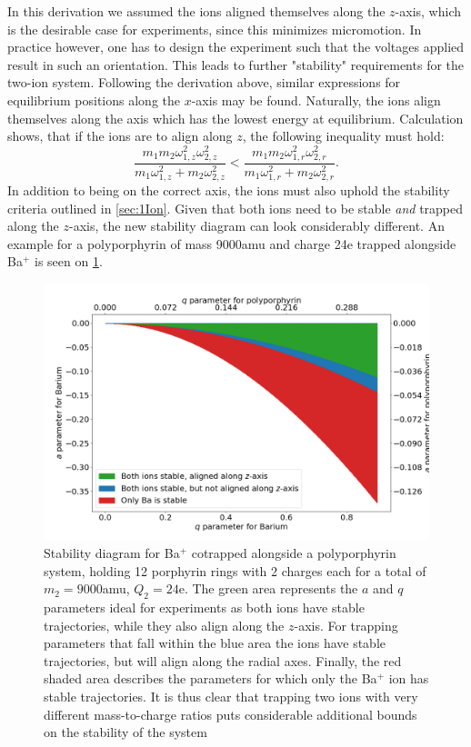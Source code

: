 In this derivation we assumed the ions aligned themselves along the $z$-axis, which is the desirable case for experiments, since this minimizes micromotion. In practice however, one has to design the experiment such that the voltages applied result in such an orientation. This leads to further "stability" requirements for the two-ion system.
Following the derivation above, similar expressions for equilibrium positions along the $x$-axis may be found. Naturally, the ions align themselves along the axis which has the lowest energy at equilibrium. Calculation shows, that if the ions are to align along $z$, the following inequality must hold:
\begin{equation}
    \frac{m_1m_2\omega_{1,z}^2\omega_{2,z}^2}{m_1\omega_{1,z}^2+m_2\omega_{2,z}^2} < \frac{m_1m_2\omega_{1,r}^2\omega_{2,r}^2}{m_1\omega_{1,r}^2+m_2\omega_{2,r}^2}.
\end{equation}
In addition to being on the correct axis, the ions must also uphold the stability criteria outlined in \cref{sec:1Ion}. Given that both ions need to be stable \textit{and} trapped along the $z$-axis, the new stability diagram can look considerably different. An example for a polyporphyrin of mass 9000amu and charge 24e trapped alongside Ba$^+$ is seen on \cref{fig:Stability2}.
\begin{figure}
    \centering
    \includegraphics[width = \textwidth]{main/Stability2.png}
    \caption{Stability diagram for Ba$^+$ cotrapped alongside a polyporphyrin system, holding 12 porphyrin rings with 2 charges each for a total of $m_2 = 9000$amu, $Q_2 = 24$e. The green area represents the $a$ and $q$ parameters ideal for experiments as both ions have stable trajectories, while they also align along the $z$-axis.
    For trapping parameters that fall within the blue area the ions have stable trajectories, but will align along the radial axes. Finally, the red shaded area describes the parameters for which only the Ba$^+$ ion has stable trajectories. It is thus clear that trapping two ions with very different mass-to-charge ratios puts considerable additional bounds on the stability of the system}
    \label{fig:Stability2}
\end{figure}


